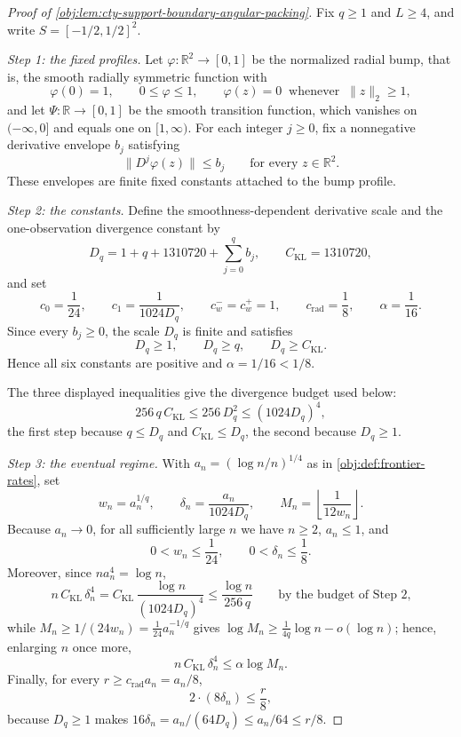 \documentclass[11pt]{article}
\begin{document}
\begin{proof}[Proof of \cref{obj:lem:cty-support-boundary-angular-packing}]
Fix \(q\ge1\) and \(L\ge4\), and write \(S=[-1/2,1/2]^2\).

\emph{Step 1: the fixed profiles.}  Let \(\varphi:\mathbb R^2\to[0,1]\) be the normalized radial bump, that is, the smooth radially symmetric function with
\[
\varphi(0)=1,
\qquad
0\le\varphi\le1,
\qquad
\varphi(z)=0\ \text{ whenever }\ \lVert z\rVert_2\ge1,
\]
and let \(\Psi:\mathbb R\to[0,1]\) be the smooth transition function, which vanishes on \((-\infty,0]\) and equals one on \([1,\infty)\).  For each integer \(j\ge0\), fix a nonnegative derivative envelope \(b_j\) satisfying
\[
\lVert D^j\varphi(z)\rVert\le b_j
\qquad\text{for every }z\in\mathbb R^2 .
\]
These envelopes are finite fixed constants attached to the bump profile.

\emph{Step 2: the constants.}  Define the smoothness-dependent derivative scale and the one-observation divergence constant by
\[
D_q=1+q+1310720+\sum_{j=0}^{q}b_j ,
\qquad
C_{\mathrm{KL}}=1310720 ,
\]
and set
\[
c_0=\frac1{24},\qquad
c_1=\frac1{1024D_q},\qquad
c_w^-=c_w^+=1,\qquad
c_{\mathrm{rad}}=\frac18,\qquad
\alpha=\frac1{16}.
\]
Since every \(b_j\ge0\), the scale \(D_q\) is finite and satisfies
\[
D_q\ge1,
\qquad
D_q\ge q,
\qquad
D_q\ge C_{\mathrm{KL}} .
\]
Hence all six constants are positive and \(\alpha=1/16<1/8\).

The three displayed inequalities give the divergence budget used below:
\[
256\,q\,C_{\mathrm{KL}}
\le
256\,D_q^{2}
\le
(1024D_q)^{4},
\]
the first step because \(q\le D_q\) and \(C_{\mathrm{KL}}\le D_q\), the second because \(D_q\ge1\).

\emph{Step 3: the eventual regime.}  With \(a_n=(\log n/n)^{1/4}\) as in \cref{obj:def:frontier-rates}, set
\[
w_n=a_n^{1/q},
\qquad
\delta_n=\frac{a_n}{1024D_q},
\qquad
M_n=\left\lfloor\frac1{12w_n}\right\rfloor .
\]
Because \(a_n\to0\), for all sufficiently large \(n\) we have \(n\ge2\), \(a_n\le1\), and
\[
0<w_n\le\frac1{24},
\qquad
0<\delta_n\le\frac18 .
\]
Moreover, since \(n a_n^{4}=\log n\),
\[
n\,C_{\mathrm{KL}}\,\delta_n^{4}
=
C_{\mathrm{KL}}\,\frac{\log n}{(1024D_q)^{4}}
\le
\frac{\log n}{256\,q}
\qquad\text{by the budget of Step 2,}
\]
while \(M_n\ge 1/(24w_n)=\tfrac1{24}a_n^{-1/q}\) gives \(\log M_n\ge \tfrac1{4q}\log n-o(\log n)\); hence, enlarging \(n\) once more,
\[
n\,C_{\mathrm{KL}}\,\delta_n^{4}\le\alpha\log M_n .
\]
Finally, for every \(r\ge c_{\mathrm{rad}}a_n=a_n/8\),
\[
2\cdot(8\delta_n)\le\frac{r}{8},
\]
because \(D_q\ge1\) makes \(16\delta_n=a_n/(64D_q)\le a_n/64\le r/8\).


\end{proof}
\end{document}
